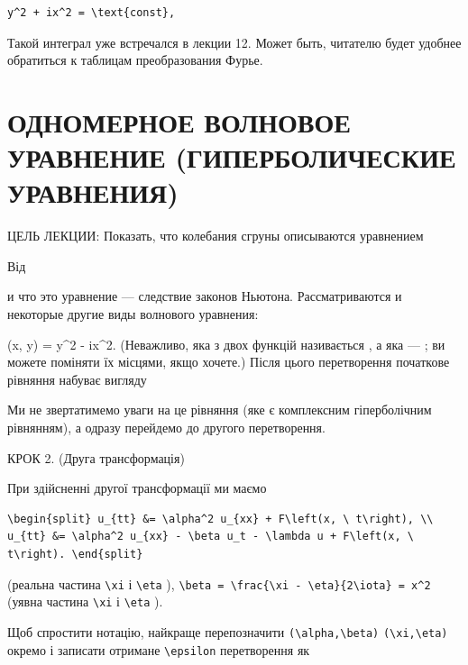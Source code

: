 \documentclass[
  ukrainian,
]{article}
\begin{document}
\begin{verbatim}
y^2 + ix^2 = \text{const},
\end{verbatim}

Такой интеграл уже встречался в лекции 12. Может быть, читателю будет
удобнее обратиться к таблицам преобразования Фурье.

\section{ОДНОМЕРНОЕ ВОЛНОВОЕ УРАВНЕНИЕ (ГИПЕРБОЛИЧЕСКИЕ
УРАВНЕНИЯ)}\label{ux43eux434ux43dux43eux43cux435ux440ux43dux43eux435-ux432ux43eux43bux43dux43eux432ux43eux435-ux443ux440ux430ux432ux43dux435ux43dux438ux435-ux433ux438ux43fux435ux440ux431ux43eux43bux438ux447ux435ux441ux43aux438ux435-ux443ux440ux430ux432ux43dux435ux43dux438ux44f}

ЦЕЛЬ ЛЕКЦИИ: Показать, что колебания сгруны описываются уравнением

Від

и что это уравнение --- следствие законов Ньютона. Рассматриваются и
некоторые другие виды волнового уравнения:

\eta(x, y) = y\^{}2 - ix\^{}2. (Неважливо, яка з двох функцій
називається \xi , а яка --- \eta ; ви можете поміняти їх місцями, якщо
хочете.) Після цього перетворення початкове рівняння набуває вигляду

Ми не звертатимемо уваги на це рівняння (яке є комплексним гіперболічним
рівнянням), а одразу перейдемо до другого перетворення.

КРОК 2. (Друга трансформація)

При здійсненні другої трансформації ми маємо

\begin{verbatim}
\begin{split} u_{tt} &= \alpha^2 u_{xx} + F\left(x, \ t\right), \\ u_{tt} &= \alpha^2 u_{xx} - \beta u_t - \lambda u + F\left(x, \ t\right). \end{split}
\end{verbatim}

(реальна частина \texttt{\textbackslash{}xi} і
\texttt{\textbackslash{}eta} ),
\texttt{\textbackslash{}beta\ =\ \textbackslash{}frac\{\textbackslash{}xi\ -\ \textbackslash{}eta\}\{2\textbackslash{}iota\}\ =\ x\^{}2}
(уявна частина \texttt{\textbackslash{}xi} і
\texttt{\textbackslash{}eta} ).

Щоб спростити нотацію, найкраще перепозначити
\texttt{(\textbackslash{}alpha,\textbackslash{}beta)}
\texttt{(\textbackslash{}xi,\textbackslash{}eta)} окремо і записати
отримане \texttt{\textbackslash{}epsilon} перетворення як
\end{document}
